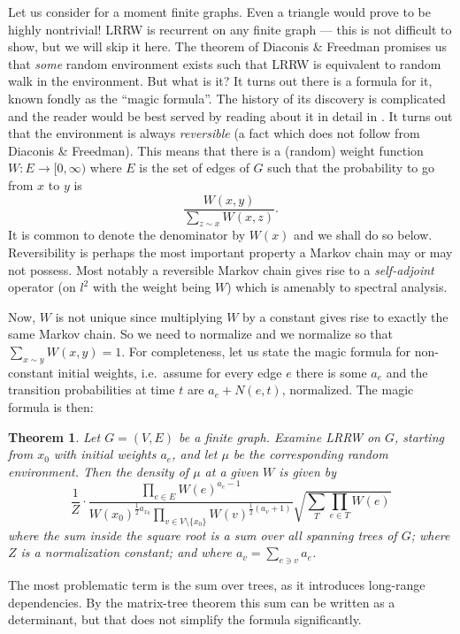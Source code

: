 \documentclass{emsprocart}
\theoremstyle{plain}
\newtheorem{thm}{Theorem}
\begin{document}
Let us consider for a moment finite graphs. Even a triangle would
prove to be highly nontrivial! LRRW is recurrent on any finite graph
--- this is not difficult to show, but we will skip it here. The theorem
of Diaconis \& Freedman promises us that \emph{some }random environment
exists such that LRRW is equivalent to random walk in the environment.
But what is it? It turns out there is a formula for it, known fondly
as the ``magic formula''. The history of its discovery is complicated
and the reader would be best served by reading about it in detail
in \cite{MOR08}. It turns out that the environment is always \emph{reversible}
(a fact which does not follow from Diaconis \& Freedman). This means
that there is a (random) weight function $W:E\to[0,\infty)$ where
$E$ is the set of edges of $G$ such that the probability to go from
$x$ to $y$ is 
\[
\frac{W(x,y)}{\sum\limits _{z\sim x}W(x,z)}.
\]
It is common to denote the denominator by $W(x)$ and we shall do
so below. Reversibility is perhaps the most important property a Markov
chain may or may not possess. Most notably a reversible Markov
chain gives rise to a \emph{self-adjoint} operator (on $l^{2}$ with
the weight being $W$) which is amenably to spectral analysis. 

Now, $W$ is not unique since multiplying $W$ by a constant gives
rise to exactly the same Markov chain. So we need to normalize and
we normalize so that $\sum_{x\sim y}W(x,y)=1$. For completeness,
let us state the magic formula for non-constant initial weights, i.e.\ assume
for every edge $e$ there is some $a_{e}$ and the transition probabilities
at time $t$ are $a_{e}+N(e,t)$, normalized. The magic formula is
then:
\begin{thm}
Let $G=(V,E)$ be a finite graph. Examine LRRW on $G$, starting from
$x_{0}$ with initial weights $a_{e}$, and let $\mu$ be the corresponding
random environment. Then the density of $\mu$ at a given $W$ is
given by
\[
\frac{1}{Z}\cdot\frac{{\displaystyle \prod_{e\in E}W(e)^{a_{e}-1}}}{{\displaystyle W(x_{0})^{\frac{1}{2}a_{x_{0}}}\prod_{v\in V\setminus\{x_{0}\}}W(v)^{\frac{1}{2}(a_{v}+1)}}}\sqrt{\sum_{T}\prod_{e\in T}W(e)}
\]
where the sum inside the square root is a sum over all spanning trees
of $G$; where $Z$ is a normalization constant; and where $a_{v}=\sum_{e\ni v}a_{e}$.
\end{thm}
The most problematic term is the sum over trees, as it introduces
long-range dependencies. By the matrix-tree theorem this sum can be
written as a determinant, but that does not simplify the formula significantly. 
\end{document}

